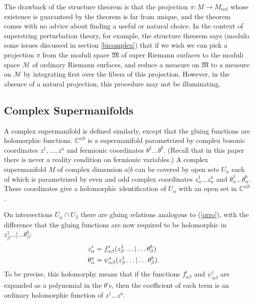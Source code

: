 \documentclass[11pt,a4paper]{article}
\def\red{{\mathrm{red}}}
\def\C{{\mathbb C}}
\def\M{{\mathcal M}}
\def\MM{{\mathfrak M}}
\begin{document}
The drawback of the structure theorem is that the projection $\pi:M\to M_\red$ whose existence is guaranteed by the theorem is far from unique,
and the theorem comes with no advice about finding a useful or natural choice.
 In the context of superstring perturbation theory, for example, the structure theorem says (modulo some issues
 discussed in section \ref{bicomplex}) that if we wish we can pick a projection
$\pi$ from the moduli space $\MM$ of super Riemann surfaces to the moduli space $\M$ of ordinary Riemann surfaces, and reduce a measure on $\MM$ to a measure
on $\M$ by integrating first over the fibers of this projection.  However, in the absence of a natural projection, this procedure may not be illuminating.



\subsection{Complex Supermanifolds}\label{complexsupermanifolds}

A complex supermanifold is defined similarly, except that the gluing functions are  holomorphic functions.  
$\C^{a|b}$ is a supermanifold parametrized by complex bosonic coordinates $z^1,\dots,z^a$ and fermionic coordinates $\theta^1\dots\theta^b$.
(Recall that in this paper there is never a reality condition on fermionic variables.) 
A complex supermanifold $ M$
of complex dimension $a|b$ can be covered by open sets $U_\alpha$ each of which is parametrized by even and odd complex coordinates $z^1_\alpha\dots z^a_\alpha$ and $\theta^1_\alpha\dots
\theta^b_\alpha$.  These coordinates give a holomorphic identification of $U_\alpha$ with an open set in $\C^{a|b}$.

On intersections $U_\alpha\cap U_\beta$ there are gluing relations analogous to  (\ref{orro}), with the difference
that the gluing functions are now required to be holomorphic in $z^1_\beta\dots|\dots\theta^b_\beta$:
\begin{align}\label{borro} z^i_\alpha & = f_{\alpha\beta}^i(z^1_\beta\dots|\dots \theta^b_\beta) \cr
                                                      \theta^s_\alpha& = \psi_{\alpha\beta}^s(z^1_\beta\dots|\dots\theta^b_\beta).\end{align}
To be precise, this holomorphy means that if the functions $f^i_{\alpha\beta}$ and $\psi^i_{\alpha\beta}$ are expanded as a polynomial
in the $\theta$'s, then the coefficient of each term is an ordinary holomorphic function of $z^1\dots z^a$.
\end{document}

